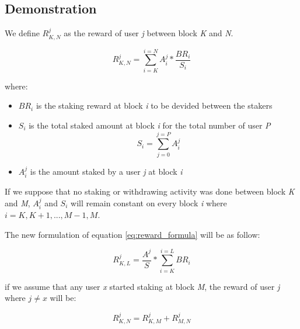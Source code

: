\documentclass[a4paper]{article}
\begin{document}
\subsection{Demonstration}
\begin{flushleft}
We define $R_{K,N}^{j}$ as the reward of user \textit{j} between block \textit{K} and \textit{N}.
\end{flushleft}
\begin{equation} \label{eq:reward_formula}
R_{K,N}^{j}= \sum_{i=K}^{i=N} A_i^j * \frac{\mathit{BR}_i}{S_i} 
\end{equation}
\begin{flushleft}
where:\
\end{flushleft}
\begin{itemize}
  \item $ \mathit{BR}_i $ is the staking reward at block \textit{i} to be devided between the stakers
  \item $ S_i$ is the total staked amount at block \textit{i} for the total number of user \textit{P} 
  	\begin{equation} \label{eq:total_stake}
	    S_i= \sum_{j=0}^{j=P}A_i^j
	  \end{equation}
  \item $A_i^j$ is the amount staked by a user \textit{j} at block \textit{i}
\end{itemize}
\begin{flushleft}
If we suppose that no staking or withdrawing activity was done between block \textit{K} and \textit{M}, $A_i^j$ and $S_i$ will remain constant on every block \textit{i} where $i=K,K+1,...,M-1,M$.
\end{flushleft}
\begin{flushleft}
The new formulation of equation \ref{eq:reward_formula} will be as follow:
\end{flushleft}
\begin{equation} \label{eq:reward_formula_fixed}
R_{K,L}^{j}= \frac{A^j}{S} * \sum_{i=K}^{i=L} \mathit{BR}_i
\end{equation}
\begin{flushleft}
if we assume that any user \textit{x} started staking at block \textit{M}, the reward of user \textit{j} where $j\neq x$ will be:
\end{flushleft}
\begin{equation} \label{eq:reward_goal_example}
R_{K,N}^{j}= R_{K,M}^{j} + R_{M,N}^{j}
\end{equation}
\end{document}
